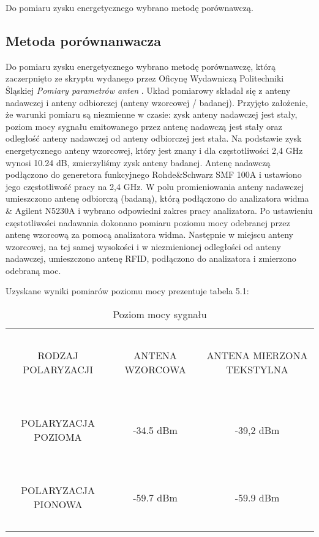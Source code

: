 Do pomiaru zysku energetycznego wybrano metodę porównawczą.

\subsection {Metoda porównanwacza}

Do pomiaru zysku energetycznego wybrano metodę porównawczę, którą zaczerpnięto ze skryptu wydanego przez Oficynę Wydawniczą Politechniki Śląskiej \emph{Pomiary parametrów anten} \cite{Pomiary_parametrów}. Układ pomiarowy składał się z anteny nadawczej  i anteny odbiorczej (anteny wzorcowej / badanej). Przyjęto założenie, że warunki pomiaru są niezmienne w czasie: zysk anteny nadawczej jest stały, poziom mocy sygnału emitowanego przez antenę nadawczą jest stały oraz odległość anteny nadawczej od anteny odbiorczej jest stała. Na podstawie zysk energetycznego anteny wzorcowej, który jest znany i dla częstotliwości 2,4 GHz wynosi 10.24 dB, zmierzyliśmy zysk anteny badanej. Antenę nadawczą podłączono do generetora funkcyjnego 
Rohde\&Schwarz SMF 100A i ustawiono jego częstotliwość pracy na 2,4 GHz. W polu promieniowania anteny nadawczej umieszczono antenę odbiorczą (badaną), którą podłączono do analizatora widma \& Agilent N5230A i wybrano odpowiedni zakres pracy analizatora. Po ustawieniu częstotliwości nadawania dokonano pomiaru poziomu mocy odebranej przez antenę wzorcową za pomocą analizatora widma. Następnie w miejscu anteny wzorcowej, na tej samej wysokości i w niezmienionej odległości od anteny nadawczej, umieszczono antenę RFID, podłączono do analizatora i zmierzono odebraną moc. 


\noindent
\newline Uzyskane wyniki pomiarów poziomu mocy prezentuje tabela 5.1:


\begin{table}[h!]
\begin{center}
    \begin{tabular}{|c|c|c|}
    \hline
    ~                     & ~               & ~                         \\
     RODZAJ POLARYZACJI    & ANTENA WZORCOWA & ANTENA MIERZONA TEKSTYLNA \\
    ~                     & ~               & ~                         \\ \hline
    ~                     & ~               & ~                         \\
     POLARYZACJA POZIOMA  & -34.5 dBm       & -39,2 dBm                 \\
    ~                     & ~               & ~                         \\ \hline
    ~                     & ~               & ~                         \\
     POLARYZACJA PIONOWA  & -59.7 dBm       & -59.9 dBm                 \\
    ~                     & ~               & ~                         \\ \hline
    \end{tabular}
    \caption{Poziom mocy sygnału}
\end{center}
\end{table}


